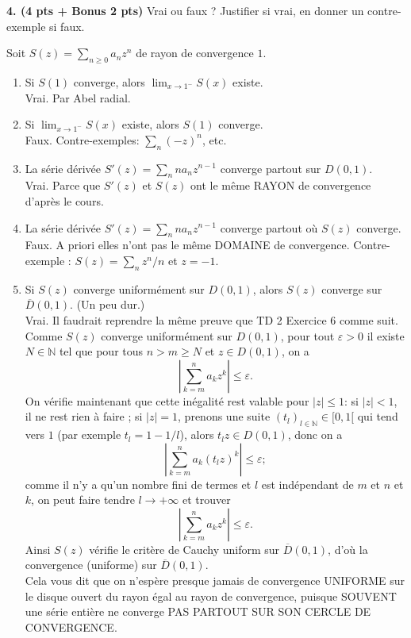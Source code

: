 \documentclass[a4paper,10pt]{article}
\newcommand{\N}{\mathbb{N}}
\newcommand{\abs}[1]{\left|#1\right|}
\newcommand{\correction}[1]{{\color{red}#1}}
\newcommand{\comment}[1]{{\color{blue}#1}}
\begin{document}
\vspace{.1in}
\noindent
\textbf{4. (4 pts + Bonus 2 pts)}
Vrai ou faux ? Justifier si vrai, en donner un contre-exemple si faux.

Soit $S(z)=\sum_{n\geq0} a_nz^n$ de rayon de convergence $1$.
\begin{enumerate}[label=\alph*)]
    \item Si $S(1)$ converge, alors $\lim_{x\to 1^-}S(x)$ existe. \\
    \correction{Vrai. Par Abel radial.}
    \item Si $\lim_{x\to1^-}S(x)$ existe, alors $S(1)$ converge. \\
    \correction{Faux. Contre-exemples: $\sum_n(-z)^n$, etc.}
    \item La série dérivée $S'(z)=\sum_n na_nz^{n-1}$ converge partout sur $D(0,1)$. \\
    \correction{Vrai. Parce que $S'(z)$ et $S(z)$ ont le même RAYON de convergence d'après le cours.}
    \item La série dérivée $S'(z)=\sum_n na_nz^{n-1}$ converge partout où $S(z)$ converge. \\
    \correction{Faux. A priori elles n'ont pas le même DOMAINE de convergence. Contre-exemple : $S(z)=\sum_nz^n/n$ et $z=-1$.}
    \item Si $S(z)$ converge uniformément sur $D(0,1)$, alors $S(z)$ converge sur $\overline{D}(0,1)$. (Un peu dur.) \\
    \correction{Vrai. Il faudrait reprendre la même preuve que TD 2 Exercice 6 comme suit. Comme $S(z)$ converge uniformément sur $D(0,1)$, pour tout $\varepsilon>0$ il existe $N\in\N$ tel que pour tous $n>m\geq N$ et $z\in D(0,1)$, on a
    $$\abs{\sum_{k=m}^na_kz^k}\leq\varepsilon.$$
    On vérifie maintenant que cette inégalité rest valable pour $\abs{z}\leq 1$: si $\abs{z}<1$, il ne rest rien à faire ; si $\abs{z}=1$, prenons une suite $(t_l)_{l\in\N}\in[0,1[$ qui tend vers $1$ (par exemple $t_l=1-1/l$), alors $t_lz\in D(0,1)$, donc on a
    $$\abs{\sum_{k=m}^na_k\left(t_lz\right)^k}\leq\varepsilon;$$
    comme il n'y a qu'un nombre fini de termes et $l$ est indépendant de $m$ et $n$ et $k$, on peut faire tendre $l\to+\infty$ et trouver
    $$\abs{\sum_{k=m}^na_kz^k}\leq\varepsilon.$$
    Ainsi $S(z)$ vérifie le critère de Cauchy uniform sur $\overline{D}(0,1)$, d'où la convergence (uniforme) sur $\overline{D}(0,1)$.
    }\\
    \comment{Cela vous dit que on n'espère presque jamais de convergence UNIFORME sur le disque ouvert du rayon égal au rayon de convergence, puisque SOUVENT une série entière ne converge PAS PARTOUT SUR SON CERCLE DE CONVERGENCE.}

\end{enumerate}
\end{document}
